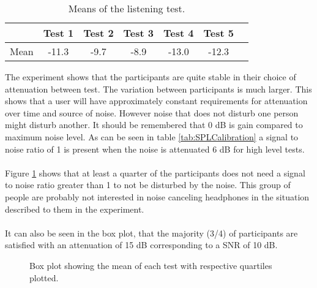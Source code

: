 \begin{table}[H]
	\centering
	\begin{tabular}{*{7}{c}}
		\hline
		& Test 1 & Test 2 & Test 3  & Test 4  & Test 5  
		\\
		\hline
		Mean & -11.3 & -9.7 & -8.9	 & -13.0 & -12.3 \\
		\hline
	\end{tabular}
	\caption{Means of the listening test.}
	\label{tab:MeanListeningResults}
\end{table}
The experiment shows that the participants are quite stable in their choice of attenuation between test. The variation between participants is much larger. This shows that a user will have approximately constant requirements for attenuation over time and source of noise. However noise that does not disturb one person might disturb another.  
It should be remembered that 0 dB is gain compared to maximum noise level. As can be seen in table \ref{tab:SPLCalibration} a signal to noise ratio of 1 is present when the noise is attenuated 6 dB for high level tests. \\\\
Figure \ref{fig:ResAttExp} shows that at least a quarter of the participants does not need a signal to noise ratio greater than 1 to not be disturbed by the noise. This group of people are probably not interested in noise canceling headphones in the situation described to them in the experiment. \\\\
It can also be seen in the box plot, that the majority (3/4) of participants are satisfied with an attenuation of 15 dB corresponding to a SNR of 10 dB. %

\begin{figure}[H]
	\centering
	
	\caption{Box plot showing the mean of each test with respective quartiles plotted.}
	\label{fig:ResAttExp}
\end{figure}


